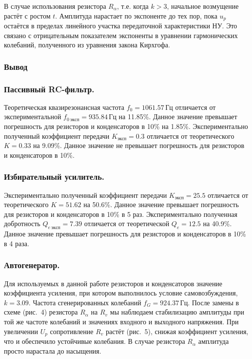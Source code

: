 \documentclass[a4paper, 12pt]{article}
\begin{document}
В случае использования резистора \( R_\alpha \), т.е. когда \( k > 3 \), начальное возмущение растёт с ростом \( t \). Амплитуда нарастает по экспоненте до тех пор, пока \( u_p \) остаётся в пределах линейного участка передаточной характеристики НУ. Это связано с отрицательным показателем экспоненты в уравнении гармонических колебаний, полученного из уравнения закона Кирхгофа.

\subsubsection*{Вывод}

\subsubsection*{Пассивный RC-фильтр.} 
Теоретическая квазирезонансная частота \( f_0 = 1061.57 \, \text{Гц} \) отличается от экспериментальной \( f_{0\ эксп} = 935.84 \, \text{Гц} \) на 11.85\%. Данное значение превышает погрешность для резисторов и конденсаторов в 10\% на 1.85\%. Экспериментально полученный коэффициент передачи \( K_{\text{эксп}} = 0.3 \) отличается от теоретического \( K = 0.33 \) на 9.09\%. Данное значение не превышает погрешность для резисторов и конденсаторов в 10\%.

\subsubsection*{Избирательный усилитель.} 
Экспериментально полученный коэффициент передачи \( K_{\text{эксп}} = 25.5 \) отличается от теоретического \( K = 51.62 \) на 50.6\%. Данное значение превышает погрешность для резисторов и конденсаторов в 10\% в 5 раз. Экспериментально полученная добротность \( Q_{e\ эксп} = 7.39 \) отличается от теоретической \( Q_e = 12.5 \) на 40.9\%. Данное значение превышает погрешность для резисторов и конденсаторов в 10\% в 4 раза.

\subsubsection*{Автогенератор.} 
Для используемых в данной работе резисторов и конденсаторов значение коэффициента усиления, при котором выполнилось условие самовозбуждения, \( k = 3.09 \). Частота сгенерированных колебаний \( f_G = 924.37 \, \text{Гц} \). После замены в схеме (рис.~4) резистора \( R_\alpha \) на \( R_v \) мы наблюдаем стабилизацию амплитуды при той же частоте колебаний и значениях входного и выходного напряжения. При увеличении \( U_p \) сопротивление \( R_v \) растёт (рис.~5), снижая коэффициент усиления, что и обеспечило устойчивые колебания. В случае резистора \( R_\alpha \) амплитуда просто нарастала до насыщения.
\end{document}
